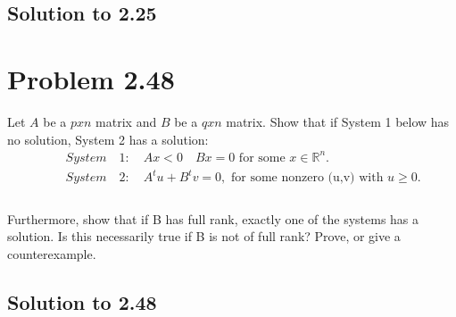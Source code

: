 \documentclass[12pt]{article}
\begin{document}
\subsection{Solution to 2.25}

\section{Problem 2.48}
Let $A$ be a $p x n$ matrix and $B$ be a $q x n$ matrix. Show that if System 1 below has no solution, System 2 has a solution:\\
    \begin{align*}
        &\quad System \quad 1: \quad Ax < 0 \quad Bx =0 \text{ for some } x \in \mathbb{R}^n.\\
        &\quad System \quad 2: \quad A^tu + B^tv  = 0 ,\text{ for some  nonzero (u,v) with } u \geq 0.\\
    \end{align*} \\
Furthermore, show that if B has full rank, exactly one of the systems has a solution. Is this necessarily true if B is not of full rank? Prove, or give a counterexample.\\ 

\subsection{Solution to 2.48}
\end{document}
